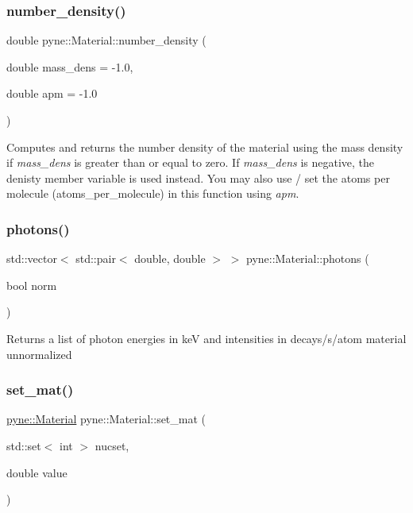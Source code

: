 \subsubsection{\texorpdfstring{number\+\_\+density()}{number\_density()}}
{\footnotesize\ttfamily double pyne\+::\+Material\+::number\+\_\+density (\begin{DoxyParamCaption}\item[{double}]{mass\+\_\+dens = {\ttfamily -\/1.0},  }\item[{double}]{apm = {\ttfamily -\/1.0} }\end{DoxyParamCaption})}

Computes and returns the number density of the material using the mass density if {\itshape mass\+\_\+dens} is greater than or equal to zero. If {\itshape mass\+\_\+dens} is negative, the denisty member variable is used instead. You may also use / set the atoms per molecule (atoms\+\_\+per\+\_\+molecule) in this function using {\itshape apm}. \mbox{\label{classpyne_1_1_material_a3630f6f54a7ff6355da0b76b4d0e35a1}} 
\subsubsection{\texorpdfstring{photons()}{photons()}}
{\footnotesize\ttfamily std\+::vector$<$ std\+::pair$<$ double, double $>$ $>$ pyne\+::\+Material\+::photons (\begin{DoxyParamCaption}\item[{bool}]{norm }\end{DoxyParamCaption})}

Returns a list of photon energies in keV and intensities in decays/s/atom material unnormalized \mbox{\label{classpyne_1_1_material_a17530f493ed5ba0d7f6e9e46c3a49744}} 
\subsubsection{\texorpdfstring{set\+\_\+mat()}{set\_mat()}\hspace{0.1cm}{\footnotesize\ttfamily [1/2]}}
{\footnotesize\ttfamily \hyperlink{classpyne_1_1_material}{pyne\+::\+Material} pyne\+::\+Material\+::set\+\_\+mat (\begin{DoxyParamCaption}\item[{std\+::set$<$ int $>$}]{nucset,  }\item[{double}]{value }\end{DoxyParamCaption})}

